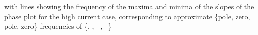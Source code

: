 \cite[p.\ 3787]{Wagner1998} with lines showing the frequency of the maxima and minima of the slopes of the phase plot for the high current case, corresponding to approximate \{pole, zero, pole, zero\} frequencies of \{, , ~, ~\}%

